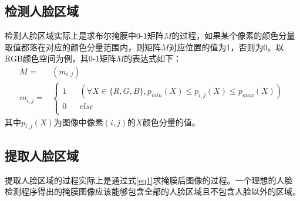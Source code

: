 \documentclass[a4paper]{ctexart}
\begin{document}
\begin{spacing}{1.5}
\subsection{检测人脸区域}
检测人脸区域实际上是求布尔掩膜中0-1矩阵$M$的过程，如果某个像素的颜色分量取值都落在对应的颜色分量范围内，则矩阵$M$对应位置的值为1，否则为0。以RGB颜色空间为例，其0-1矩阵$M$的表达式如下：
\begin{equation}
\begin{split}
M=&(m_{i,j})\\
m_{i,j}=&
\left\{
\begin{aligned}
1& &(\forall X\in\{R,G,B\},p_{min}(X)\leq p_{i,j}(X)\leq p_{max}(X))\\
0& &else\\
\end{aligned}
\right.
\end{split}
\end{equation}
其中$p_{i,j}(X)$为图像中像素$(i,j)$的$X$颜色分量的值。
\subsection{提取人脸区域}
提取人脸区域的过程实际上是通过式\ref{eq1}求掩膜后图像的过程。一个理想的人脸检测程序得出的掩膜图像应该能够包含全部的人脸区域且不包含人脸以外的区域。

\end{spacing}
\end{document}
